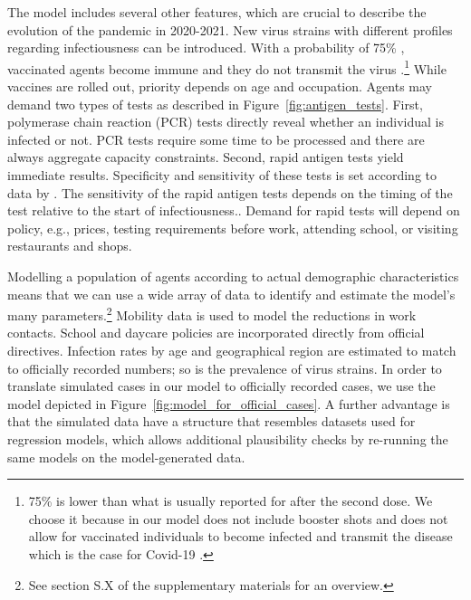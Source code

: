 The model includes several other features, which are crucial to describe the evolution
of the pandemic in 2020-2021. New virus strains with different profiles regarding
infectiousness  can be introduced. With a
probability of 75\% \citep{Hunter2021}, vaccinated agents become immune and they do not
transmit the virus \citep{Petter2021, LevineTiefenbrun2021,
Pritchard2021}.\footnote{75\% is lower than what is usually reported for after the
second dose. We choose it because in our model does not include booster shots and does
not allow for vaccinated individuals to become infected and transmit the disease which
is the case for Covid-19 \citep{Petter2021, LevineTiefenbrun2021,
Pritchard2021}.}%
While vaccines are rolled out, priority depends on age and occupation. Agents may demand
two types of tests as described in Figure~\ref{fig:antigen_tests}. First, polymerase
chain reaction (PCR) tests directly reveal whether an individual is infected or not. PCR
tests require some time to be processed and there are always aggregate capacity
constraints. Second, rapid antigen tests yield immediate results. Specificity and
sensitivity of these tests is set according to data by \cite{Bruemmer2021, Smith2021} .
The sensitivity of the rapid antigen tests depends on the timing of the test relative to
the start of infectiousness.. Demand for rapid tests will depend on policy, e.g., prices, testing
requirements before work, attending school, or visiting restaurants and shops.

Modelling a population of agents according to actual demographic characteristics means
that we can use a wide array of data to identify and estimate the model's many
parameters.\footnote{See section S.X of the supplementary materials for an
overview.} Mobility data is used to
model the reductions in work contacts. School and daycare policies are incorporated
directly from official directives. Infection rates by age and geographical region are
estimated to match to officially recorded numbers; so is the prevalence of virus
strains. In order to translate simulated cases in our model to officially recorded
cases, we use the model depicted in
Figure~\ref{fig:model_for_official_cases}. A further
advantage is that the simulated data have a structure that resembles datasets used for
regression models, which allows additional plausibility checks by re-running the same
models on the model-generated data.

